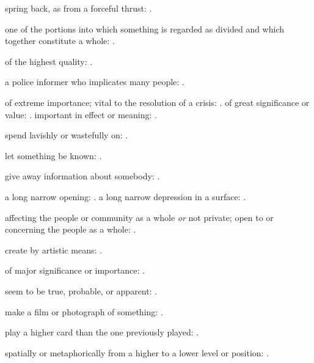   spring back, as from a forceful thrust:   .

  one of the portions into which something is regarded as divided and which together constitute a whole:   .

  of the highest quality:   .

  a police informer who implicates many people:   .

  of extreme importance; vital to the resolution of a crisis:   . of great significance or value:   . important in effect or meaning:   .

  spend lavishly or wastefully on: .

  let something be known: .

  give away information about somebody:   .

  a long narrow opening:   . a long narrow depression in a surface:   .

  affecting the people or community as a whole \textit{or} not private; open to or concerning the people as a whole: .

  create by artistic means:   .

  of major significance or importance:   .

  seem to be true, probable, or apparent:   .

  make a film or photograph of something:   .

  play a higher card than the one previously played: .

  spatially or metaphorically from a higher to a lower level or position:   .


